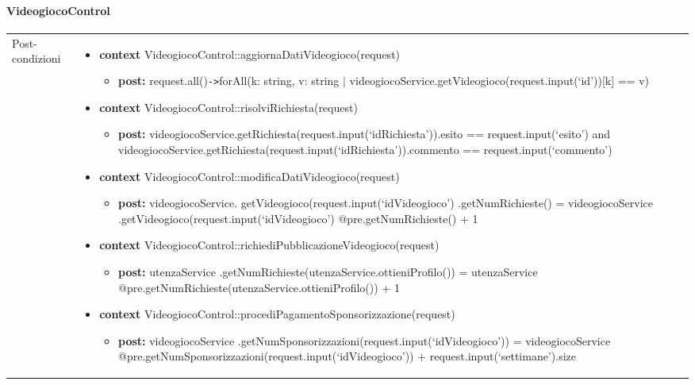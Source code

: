 \paragraph{VideogiocoControl}
\small\begin{tabular}{|| l | p{28em} ||} 
\hline
Post-condizioni & \begin{itemize}[leftmargin=*]
	\item \textbf{context} VideogiocoControl::aggiornaDatiVideogioco(request)
	\begin{itemize}
		\item[ ] \textbf{post:} request.all()\verb|->|forAll(k: string, v: string $|$ videogiocoService.getVideogioco(request.input(‘id’))[k] == v)	
	\end{itemize}

	\item \textbf{context} VideogiocoControl::risolviRichiesta(request)
	\begin{itemize}
		\item[ ] \textbf{post:} videogiocoService.getRichiesta(request.input(‘idRichiesta’)).esito == request.input(‘esito’) and videogiocoService.getRichiesta(request.input(‘idRichiesta’)).commento == request.input(‘commento’)
	\end{itemize}

	\item \textbf{context} VideogiocoControl::modificaDatiVideogioco(request)
	\begin{itemize}
		\item[ ] \textbf{post:} videogiocoService.
		getVideogioco(request.input(‘idVideogioco’)
		.getNumRichieste() =
		videogiocoService
		.getVideogioco(request.input(‘idVideogioco’)
		@pre.getNumRichieste() + 1	
	\end{itemize}

	\item \textbf{context} VideogiocoControl\newline ::richiediPubblicazioneVideogioco(request)
	\begin{itemize}
		\item[ ] \textbf{post:} utenzaService
		.getNumRichieste(utenzaService.ottieniProfilo()) =
		utenzaService
		@pre.getNumRichieste(utenzaService.ottieniProfilo()) + 1	
	\end{itemize}

	\item \textbf{context} VideogiocoControl\newline ::procediPagamentoSponsorizzazione(request)
	\begin{itemize}
		\item[ ] \textbf{post:} videogiocoService
		.getNumSponsorizzazioni(request.input(‘idVideogioco’)) =
		videogiocoService
		\newline @pre.getNumSponsorizzazioni(request\newline .input(‘idVideogioco’)) + request.input(‘settimane’).size	
	\end{itemize}


\end{itemize}
\end{tabular}
